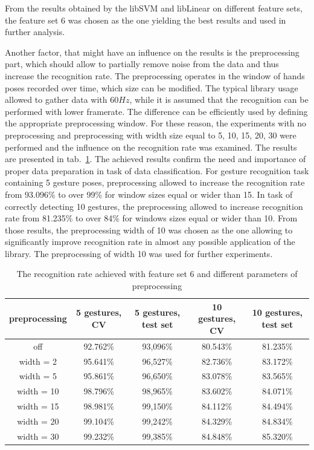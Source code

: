 From the results obtained by the libSVM and libLinear on different feature sets, the feature set 6 was chosen as the one yielding the best results and used in further analysis.


Another factor, that might have an influence on the results is the preprocessing part, which should allow to partially remove noise from the data and thus increase the recognition rate. 
The preprocessing operates in the window of hands poses recorded over time, which size can be modified. 
The typical library usage allowed to gather data with $60Hz$, while it is assumed that the recognition can be performed with lower framerate. The difference can be efficiently used by defining the appropriate preprocessing window.
For these reason, the experiments with no preprocessing and preprocessing with width size equal to 5, 10, 15, 20, 30 were performed and the influence on the recognition rate was examined.
The results are presented in tab.~\ref{staticpre}.
The achieved results confirm the need and importance of proper data preparation in task of data classification.
For gesture recognition task containing 5 gesture poses, preprocessing allowed to increase the recognition rate from 93.096\% to over 99\% for window sizes equal or wider than 15. 
In task of correctly detecting 10 gestures, the preprocessing allowed to increase recognition rate from 81.235\% to over 84\% for windows sizes equal or wider than 10.
From those results, the preprocessing width of 10 was chosen as the one allowing to significantly improve recognition rate in almost any possible application of the library.
The preprocessing of width 10 was used for further experiments.

\begin{table}[htp!]
\begin{center}
	\label{staticpre}
	\caption{The recognition rate achieved with feature set 6 and different parameters of preprocessing}
    \begin{tabular}{|c|c|c|c|c|}
    \hline
    preprocessing                                                   & 5 gestures, CV & 5 gestures, test set & 10 gestures, CV  & 10 gestures, test set \\ \hline
    off                     & 92.762\% & 93,096\%  & 80.543\% & 81.235\% \\ \hline
    width = 2               & 95.641\% & 96,527\%  & 82.736\% & 83.172\% \\ \hline
    width = 5               & 95.861\% & 96,650\%  & 83.078\% & 83.565\% \\ \hline
    width = 10              & 98.796\% & 98,965\%  & 83.602\% & 84.071\% \\ \hline
    width = 15              & 98.981\% & 99,150\%  & 84.112\% & 84.494\% \\ \hline
    width = 20              & 99.104\% & 99,242\%  & 84.329\% & 84.834\% \\ \hline
    width = 30              & 99.232\% & 99,385\%  & 84.848\% & 85.320\% \\ \hline
    \end{tabular}
    \end{center}
\end{table}

